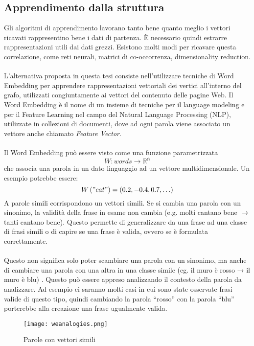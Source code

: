 \subsection{Apprendimento dalla struttura}
Gli algoritmi di apprendimento lavorano tanto bene quanto meglio i vettori ricavati rappresentino bene i dati di partenza. È necessario quindi estrarre rappresentazioni utili dai dati grezzi. Esistono molti modi per ricavare questa correlazione, come reti neurali, matrici di co-occorrenza, dimensionality reduction.
\\\\
L'alternativa proposta in questa tesi consiste nell'utilizzare tecniche di Word Embedding per apprendere rappresentazioni vettoriali dei vertici all'interno del grafo, utilizzati congiuntamente ai vettori del contenuto delle pagine Web.
Il Word Embedding è il nome di un insieme di tecniche per il language modeling e per il Feature Learning nel campo del Natural Language Processing (NLP)\cite{Bengio03}, utilizzate  in collezioni di documenti, dove ad ogni parola viene associato un vettore anche chiamato \textit{Feature Vector}. 
\\\\
Il Word Embedding può essere visto come una funzione parametrizzata 
\begin{equation}
  W : words \to \mathbb{R^n}
\end{equation}
che associa una parola in un dato linguaggio ad un vettore multidimensionale. Un esempio potrebbe essere:
\begin{equation}
  W\left ( "cat" \right ) = \left ( 0.2, -0.4, 0.7, \ldots \right )
\end{equation}
A parole simili corrispondono un vettori simili. Se si cambia una parola con un sinonimo, la validità della frase in esame non cambia (e.g. molti cantano bene $\to$ tanti cantano bene). Questo permette di generalizzare da una frase ad una classe di frasi simili o di capire se una frase è valida, ovvero se  è formulata correttamente.  
\\\\
Questo non significa solo poter scambiare una parola con un sinonimo, ma anche di cambiare una parola con una altra in una classe simile (eg. il muro è rosso → il muro è blu) \cite{Collobert11}. Questo può essere appreso analizzando il contesto della parola da analizzare. Ad esempio ci saranno molti casi in cui sono state osservate frasi valide di questo tipo, quindi cambiando la parola “rosso” con la parola “blu” porterebbe alla creazione una frase ugualmente valida. 
\begin{figure}[htb]
	\centering
	\texttt{[image: weanalogies.png]}
	\caption{Parole con vettori simili}
	\label{similarwords}
\end{figure}

